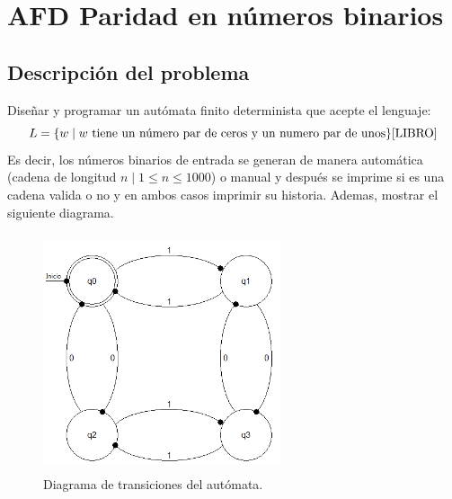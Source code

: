 \section{AFD Paridad en números binarios}
	\subsection{Descripción del problema}
	Diseñar y programar un autómata finito determinista que acepte el lenguaje:
	\[ L = \lbrace w \mid w \text{ tiene un número par de ceros y un numero par de unos} \rbrace \text{\cite{LIBRO}}\] 
	Es decir, los números binarios de entrada se generan de manera automática (cadena de longitud $n \mid 1\leq n \leq 1000$) o manual y después se imprime si es una cadena valida o no y en ambos casos imprimir su historia. Ademas, mostrar el siguiente diagrama.
	\begin{figure}[H]
		\begin{center}
			\includegraphics[width=7cm, height=7cm]{img/paridad.png}
			\caption{Diagrama de transiciones del autómata. \cite{LIBRO}}
			\label{fig:diagrama2}
		\end{center}
	\end{figure}
